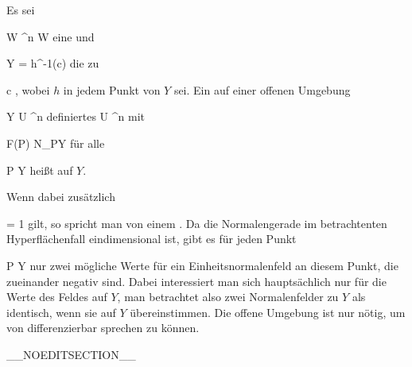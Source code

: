 {}
{

Es sei

\mavergleichskette
{\vergleichskette
{ W
}
{ \subseteq }{ \R^n
}
{  }{
}
{    }{
}
{   }{
}
}
{}{}{}
 { W } { \R
} {}
eine
und

\mavergleichskette
{\vergleichskette
{ Y
}
{ = }{ h^{-1}(c)
}
{  }{
}
{    }{
}
{   }{
}
}
{}{}{}
die
zu

\mavergleichskette
{\vergleichskette
{ c
}
{ \in }{ \R
}
{  }{
}
{    }{
}
{   }{
}
}
{}{}{,}
wobei $h$ in jedem Punkt von $Y$
sei. Ein auf einer offenen Umgebung

\mavergleichskette
{\vergleichskette
{ Y
}
{ \subseteq }{ U
}
{ \subseteq }{ \R^n
}
{    }{
}
{   }{
}
}
{}{}{}
definiertes
 {U} {\R^n
} {}
mit

\mavergleichskettedisp
{\vergleichskette
{ F(P)
}
{ \in} { N_PY
}
{ } {
}
{ } {
}
{ } {
}
}
{}{}{}
für alle

\mavergleichskette
{\vergleichskette
{ P
}
{ \in }{ Y
}
{  }{
}
{    }{
}
{   }{
}
}
{}{}{}
heißt
auf $Y$.

}

Wenn dabei zusätzlich

\mavergleichskettedisp
{\vergleichskette
{  \Vert
}
{ =} { 1
}
{ } {
}
{ } {
}
{ } {
}
}
{}{}{}
gilt, so spricht man von einem  {.} Da die Normalengerade im betrachtenten Hyperflächenfall eindimensional ist, gibt es für jeden Punkt

\mavergleichskette
{\vergleichskette
{ P
}
{ \in }{ Y
}
{  }{
}
{    }{
}
{   }{
}
}
{}{}{}
nur zwei mögliche Werte für ein Einheitsnormalenfeld an diesem Punkt, die zueinander negativ sind. Dabei interessiert man sich hauptsächlich nur für die Werte des Feldes auf $Y$, man betrachtet also zwei Normalenfelder zu $Y$ als identisch, wenn sie auf $Y$ übereinstimmen. Die offene Umgebung ist nur nötig, um von differenzierbar sprechen zu können.

__NOEDITSECTION__

